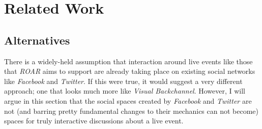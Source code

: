 % 
%



\section{Related Work}

%

\subsection{Alternatives}

There is a widely-held assumption that interaction around live events like those that \emph{ROAR} aims to support are already taking place on existing social networks like \emph{Facebook} and \emph{Twitter}. If this were true, it would suggest a very different approach; one that looks much more like \emph{Visual Backchannel}. However, I will argue in this section that the social spaces created by \emph{Facebook} and \emph{Twitter} are not (and barring pretty fundamental changes to their mechanics can not become) spaces for truly interactive discussions about a live event.

